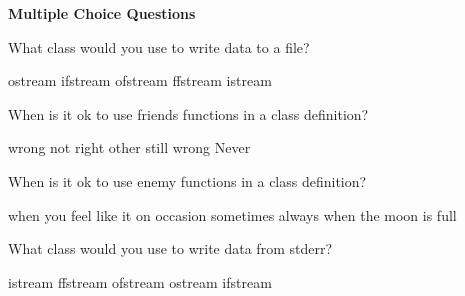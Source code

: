 \documentclass[10pt,answers,addpoints]{exam}
\begin{document}
\begin{questions}
\begin{minipage}{\linewidth}
\medskip
\end{minipage}


\newpage
\begin{center}
{\Large \textbf{Multiple Choice Questions}}
\end{center}

\par\vspace{0.100000in}\begin{minipage}{\linewidth}
\question[2]
What class would you use to write data to a file?
\medskip
\begin{choices}
\choice ostream
\choice ifstream
\choice ofstream
\choice ffstream
\choice istream
\end{choices}
\setlength\answerlinelength{1in}
\answerline[C]

\end{minipage}


\par\vspace{0.100000in}\begin{minipage}{\linewidth}
\question[2]
When is it ok to use friends functions in a class definition?
\medskip
\begin{choices}
\choice wrong
\choice not right
\choice other
\choice still wrong
\choice Never
\end{choices}
\setlength\answerlinelength{1in}
\answerline[E]

\end{minipage}


\par\vspace{0.100000in}\begin{minipage}{\linewidth}
\question[2]
When is it ok to use enemy functions in a class definition?
\medskip
\begin{choices}
\choice when you feel like it
\choice on occasion
\choice sometimes
\choice always
\choice when the moon is full
\end{choices}
\setlength\answerlinelength{1in}
\answerline[D]

\end{minipage}


\par\vspace{0.100000in}\begin{minipage}{\linewidth}
\question[2]
What class would you use to write data from stderr?
\medskip
\begin{choices}
\choice istream
\choice ffstream
\choice ofstream
\choice ostream
\choice ifstream
\end{choices}
\setlength\answerlinelength{1in}
\answerline[D]


\end{minipage}
\end{questions}
\end{document}
